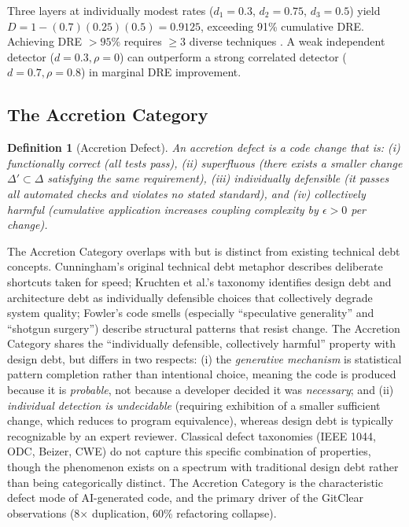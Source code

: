 \documentclass[11pt, a4paper, logo, copyright]{googledeepmind}
\newtheorem{definition}{Definition}[section]
\begin{document}
Three layers at individually modest rates ($d_1 = 0.3$, $d_2 = 0.75$, $d_3 = 0.5$) yield $D = 1 - (0.7)(0.25)(0.5) = 0.9125$, exceeding 91\% cumulative DRE. Achieving DRE $> 95\%$ requires $\geq 3$ diverse techniques \citep{capersjones2012}. A weak independent detector ($d = 0.3, \rho = 0$) can outperform a strong correlated detector ($d = 0.7, \rho = 0.8$) in marginal DRE improvement.

\subsection{The Accretion Category}

\begin{definition}[Accretion Defect]
\label{def:accretion}
An \emph{accretion defect} is a code change that is: (i) functionally correct (all tests pass), (ii) superfluous (there exists a smaller change $\Delta' \subset \Delta$ satisfying the same requirement), (iii) individually defensible (it passes all automated checks and violates no stated standard), and (iv) collectively harmful (cumulative application increases coupling complexity by $\epsilon > 0$ per change).
\end{definition}

The Accretion Category overlaps with but is distinct from existing technical debt concepts. Cunningham's original technical debt metaphor \citep{cunningham1992} describes deliberate shortcuts taken for speed; Kruchten et al.'s taxonomy \citep{kruchten2012} identifies design debt and architecture debt as individually defensible choices that collectively degrade system quality; Fowler's code smells (especially ``speculative generality'' and ``shotgun surgery'') describe structural patterns that resist change. The Accretion Category shares the ``individually defensible, collectively harmful'' property with design debt, but differs in two respects: (i) the \emph{generative mechanism} is statistical pattern completion rather than intentional choice, meaning the code is produced because it is \emph{probable}, not because a developer decided it was \emph{necessary}; and (ii) \emph{individual detection is undecidable} (requiring exhibition of a smaller sufficient change, which reduces to program equivalence), whereas design debt is typically recognizable by an expert reviewer. Classical defect taxonomies (IEEE 1044, ODC, Beizer, CWE) do not capture this specific combination of properties, though the phenomenon exists on a spectrum with traditional design debt rather than being categorically distinct. The Accretion Category is the characteristic defect mode of AI-generated code, and the primary driver of the GitClear observations (8$\times$ duplication, 60\% refactoring collapse).
\end{document}
